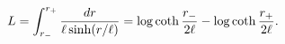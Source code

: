 \begin{equation}
L=\int_{r_-}^{r_+}\frac{dr}
{\ell\sinh(r/\ell)}=
\log\coth{r_-\over 2\ell}-\log\coth{r_+\over 2\ell}.
\end{equation}

